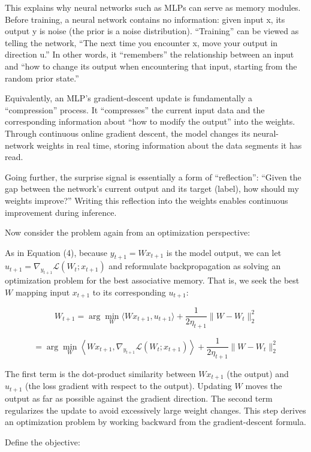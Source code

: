 This explains why neural networks such as MLPs can serve as memory modules. Before training, a neural network contains no information: given input x, its output y is noise (the prior is a noise distribution). ``Training'' can be viewed as telling the network, ``The next time you encounter x, move your output in direction u.'' In other words, it ``remembers'' the relationship between an input and ``how to change its output when encountering that input, starting from the random prior state.''

Equivalently, an MLP's gradient-descent update is fundamentally a ``compression'' process. It ``compresses'' the current input data and the corresponding information about ``how to modify the output'' into the weights. Through continuous online gradient descent, the model changes its neural-network weights in real time, storing information about the data segments it has read.

Going further, the surprise signal is essentially a form of ``reflection'': ``Given the gap between the network's current output and its target (label), how should my weights improve?'' Writing this reflection into the weights enables continuous improvement during inference.

Now consider the problem again from an optimization perspective:

As in Equation (4), because \(y_{t+1}=Wx_{t+1}\) is the model output, we can let \(u_{t+1}=\nabla_{y_{t+1}}\mathcal{L}(W_t;x_{t+1})\) and reformulate backpropagation as solving an optimization problem for the best associative memory. That is, we seek the best \(W\) mapping input \(x_{t+1}\) to its corresponding \(u_{t+1}\):

\[
W_{t+1}=\arg\min_W \langle Wx_{t+1},u_{t+1}\rangle+\frac{1}{2\eta_{t+1}}\lVert W-W_t\rVert_2^2
\tag{5}
\]

\[
=\arg\min_W\left\langle Wx_{t+1},\nabla_{y_{t+1}}\mathcal{L}(W_t;x_{t+1})\right\rangle+\frac{1}{2\eta_{t+1}}\lVert W-W_t\rVert_2^2
\tag{6}
\]

The first term is the dot-product similarity between \(Wx_{t+1}\) (the output) and \(u_{t+1}\) (the loss gradient with respect to the output). Updating \(W\) moves the output as far as possible against the gradient direction. The second term regularizes the update to avoid excessively large weight changes. This step derives an optimization problem by working backward from the gradient-descent formula.

Define the objective:

